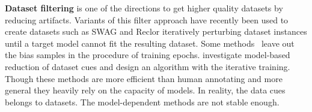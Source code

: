  
\textbf{Dataset filtering} is one of the directions to get higher quality datasets by reducing artifacts. 
Variants of this filter approach have recently
been used to create datasets such as SWAG and Reclor 
iteratively perturbing dataset instances until a target 
model cannot fit the resulting dataset. Some methods~\cite{yaghoobzadeh2019robust} 
leave out the bias samples in the procedure of training epochs. \cite{bras2020adversarial} 
investigate model-based reduction of dataset cues and design an algorithm with the iterative training. 
Though these methods are more efficient than human annotating and more general 
they heavily rely on the capacity of models. In reality, the data cues belongs to datasets. The 
model-dependent methods are not stable enough.







